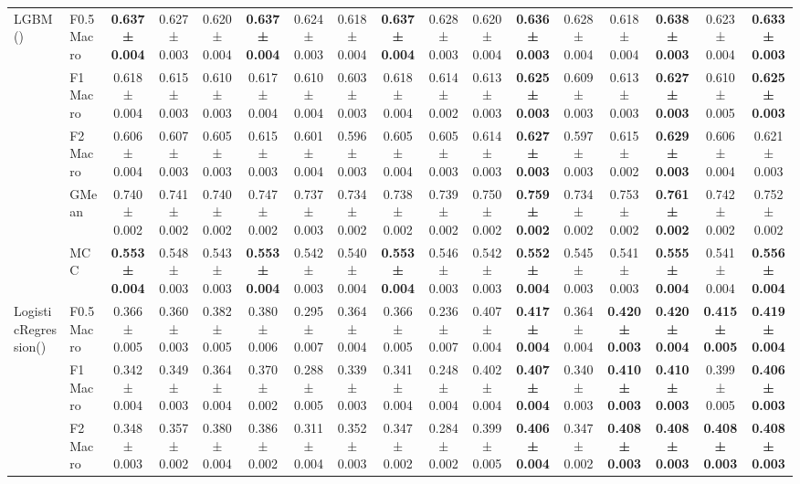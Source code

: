 \begin{table}[H]
{\begin{tabular}{llccccccccccccccc}
\cline{1-17}
\multirow[t]{5}{*}{LGBM()} & F0.5 Macro & \textbf{0.637 ± 0.004} & 0.627 ± 0.003 & 0.620 ± 0.004 & \textbf{0.637 ± 0.004} & 0.624 ± 0.003 & 0.618 ± 0.004 & \textbf{0.637 ± 0.004} & 0.628 ± 0.003 & 0.620 ± 0.004 & \textbf{0.636 ± 0.003} & 0.628 ± 0.004 & 0.618 ± 0.004 & \textbf{0.638 ± 0.003} & 0.623 ± 0.004 & \textbf{0.633 ± 0.003} \\
 & F1 Macro & 0.618 ± 0.004 & 0.615 ± 0.003 & 0.610 ± 0.003 & 0.617 ± 0.004 & 0.610 ± 0.004 & 0.603 ± 0.003 & 0.618 ± 0.004 & 0.614 ± 0.002 & 0.613 ± 0.003 & \textbf{0.625 ± 0.003} & 0.609 ± 0.003 & 0.613 ± 0.003 & \textbf{0.627 ± 0.003} & 0.610 ± 0.005 & \textbf{0.625 ± 0.003} \\
 & F2 Macro & 0.606 ± 0.004 & 0.607 ± 0.003 & 0.605 ± 0.003 & 0.615 ± 0.003 & 0.601 ± 0.004 & 0.596 ± 0.003 & 0.605 ± 0.004 & 0.605 ± 0.003 & 0.614 ± 0.003 & \textbf{0.627 ± 0.003} & 0.597 ± 0.003 & 0.615 ± 0.002 & \textbf{0.629 ± 0.003} & 0.606 ± 0.004 & 0.621 ± 0.003 \\
 & GMean & 0.740 ± 0.002 & 0.741 ± 0.002 & 0.740 ± 0.002 & 0.747 ± 0.002 & 0.737 ± 0.003 & 0.734 ± 0.002 & 0.738 ± 0.002 & 0.739 ± 0.002 & 0.750 ± 0.002 & \textbf{0.759 ± 0.002} & 0.734 ± 0.002 & 0.753 ± 0.002 & \textbf{0.761 ± 0.002} & 0.742 ± 0.002 & 0.752 ± 0.002 \\
 & MCC & \textbf{0.553 ± 0.004} & 0.548 ± 0.003 & 0.543 ± 0.003 & \textbf{0.553 ± 0.004} & 0.542 ± 0.003 & 0.540 ± 0.004 & \textbf{0.553 ± 0.004} & 0.546 ± 0.003 & 0.542 ± 0.003 & \textbf{0.552 ± 0.004} & 0.545 ± 0.003 & 0.541 ± 0.003 & \textbf{0.555 ± 0.004} & 0.541 ± 0.004 & \textbf{0.556 ± 0.004} \\
\cline{1-17}
\multirow[t]{5}{*}{LogisticRegression()} & F0.5 Macro & 0.366 ± 0.005 & 0.360 ± 0.003 & 0.382 ± 0.005 & 0.380 ± 0.006 & 0.295 ± 0.007 & 0.364 ± 0.004 & 0.366 ± 0.005 & 0.236 ± 0.007 & 0.407 ± 0.004 & \textbf{0.417 ± 0.004} & 0.364 ± 0.004 & \textbf{0.420 ± 0.003} & \textbf{0.420 ± 0.004} & \textbf{0.415 ± 0.005} & \textbf{0.419 ± 0.004} \\
 & F1 Macro & 0.342 ± 0.004 & 0.349 ± 0.003 & 0.364 ± 0.004 & 0.370 ± 0.002 & 0.288 ± 0.005 & 0.339 ± 0.003 & 0.341 ± 0.004 & 0.248 ± 0.004 & 0.402 ± 0.004 & \textbf{0.407 ± 0.004} & 0.340 ± 0.003 & \textbf{0.410 ± 0.003} & \textbf{0.410 ± 0.003} & 0.399 ± 0.005 & \textbf{0.406 ± 0.003} \\
 & F2 Macro & 0.348 ± 0.003 & 0.357 ± 0.002 & 0.380 ± 0.004 & 0.386 ± 0.002 & 0.311 ± 0.004 & 0.352 ± 0.003 & 0.347 ± 0.002 & 0.284 ± 0.002 & 0.399 ± 0.005 & \textbf{0.406 ± 0.004} & 0.347 ± 0.002 & \textbf{0.408 ± 0.003} & \textbf{0.408 ± 0.003} & \textbf{0.408 ± 0.003} & \textbf{0.408 ± 0.003} \\

\end{tabular}}
\end{table}
